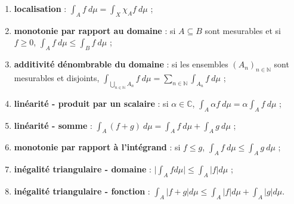 \begin{enumerate}[label=(\roman*)]
    \item \textbf{localisation} : $\int_Af\ d\mu = \int_X \chi_Af\ d\mu$ ;
    \item \textbf{monotonie par rapport au domaine} : si $A\subseteq B$ sont mesurables et si $f\geq0$, $\int_Af\ d\mu \leq \int_Bf\ d\mu$ ;
    \item \textbf{additivité dénombrable du domaine} : si les ensembles $(A_n)_{n\in\mathbb{N}}$ sont mesurables et disjoints, $\int_{\bigcup_{n\in\mathbb{N}}A_n}f\ d\mu = \sum_{n\in\mathbb{N}}\int_{A_n}f \ d\mu$ ;
    \item \textbf{linéarité - produit par un scalaire} : si $\alpha\in\mathbb{C}$, $\int_A\alpha f\ d\mu = \alpha\int_Af\ d\mu$ ;
    \item \textbf{linéarité - somme} : $\int_A(f+g)\ d\mu = \int_Af\ d\mu+\int_Ag\ d\mu$ ;
    \item \textbf{monotonie par rapport à l'intégrand} : si $f\leq g$, $\int_Af\ d\mu \leq \int_Ag\ d\mu$ ;
    \item \textbf{inégalité triangulaire - domaine} : $\Big|\int_A fd\mu\Big|\leq\int_A|f|d\mu$ ;
    \item \textbf{inégalité triangulaire - fonction} : $\int_A|f+g|d\mu\leq\int_A|f|d\mu+\int_A|g|d\mu$.
\end{enumerate}
